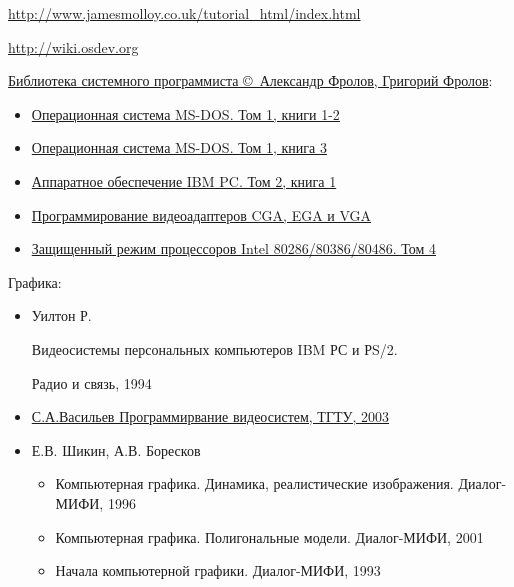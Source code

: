 \secdown


\url{http://www.jamesmolloy.co.uk/tutorial_html/index.html}

\url{http://wiki.osdev.org}

\bigskip

\href{http://www.frolov-lib.ru/bsp.html}{Библиотека системного программиста
\copyright\ Александр Фролов, Григорий Фролов}:

\begin{itemize}[nosep]
  \item \href{http://www.frolov-lib.ru/books/bsp/v01a/index.html}{Операционная
  система MS-DOS. Том 1, книги 1-2}
  \item \href{http://www.frolov-lib.ru/books/bsp/v01b/index.html}{Операционная
  система MS-DOS. Том 1, книга 3}
  \item \href{http://www.frolov-lib.ru/books/bsp/v02/index.html}{Аппаратное
  обеспечение IBM PC. Том 2, книга 1}
  \item \href{http://www.frolov-lib.ru/books/bsp/v03/index.html}{Программирование видеоадаптеров CGA, EGA и VGA}
  \item \href{http://www.frolov-lib.ru/books/bsp/v06/index.html}{Защищенный
  режим процессоров Intel 80286/80386/80486. Том 4}
\end{itemize}

\bigskip

Графика: \bigskip

\begin{itemize}[nosep]

\item 
Уилтон Р. 

Видеосистемы персональных компьютеров IBM РС и РS/2.

Радио и связь, 1994

\item

\href{http://ict.informika.ru/ft/004761/vasilev.pdf}{С.А.Васильев
Программирвание видеосистем, ТГТУ, 2003}

\item

Е.В. Шикин, А.В. Боресков

\begin{itemize}[nosep]
\item Компьютерная графика. Динамика, реалистические изображения.
Диалог-МИФИ, 1996
\item Компьютерная графика. Полигональные модели. Диалог-МИФИ, 2001
\item Начала компьютерной графики. Диалог-МИФИ, 1993
\end{itemize}

\end{itemize}


